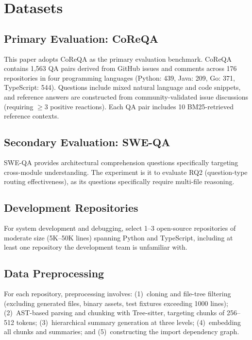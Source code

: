 \documentclass[11pt]{article}
\begin{document}
\section{Datasets}

\subsection{Primary Evaluation: CoReQA}
This paper adopts CoReQA \citep{chen2025coreqa} as the primary evaluation benchmark. CoReQA contains 1,563 QA pairs derived from GitHub issues and comments across 176 repositories in four programming languages (Python: 439, Java: 209, Go: 371, TypeScript: 544). Questions include mixed natural language and code snippets, and reference answers are constructed from community-validated issue discussions (requiring $\geq$3 positive reactions). Each QA pair includes 10 BM25-retrieved reference contexts.

\subsection{Secondary Evaluation: SWE-QA}
SWE-QA \citep{peng2025sweqa} provides architectural comprehension questions specifically targeting cross-module understanding. The experiment is it to evaluate RQ2 (question-type routing effectiveness), as its questions specifically require multi-file reasoning.

\subsection{Development Repositories}
For system development and debugging, select 1--3 open-source repositories of moderate size (5K--50K lines) spanning Python and TypeScript, including at least one repository the development team is unfamiliar with.

\subsection{Data Preprocessing}
For each repository, preprocessing involves: (1)~cloning and file-tree filtering (excluding generated files, binary assets, test fixtures exceeding 1000 lines); (2)~AST-based parsing and chunking with Tree-sitter, targeting chunks of 256--512 tokens; (3)~hierarchical summary generation at three levels; (4)~embedding all chunks and summaries; and (5)~constructing the import dependency graph.
\end{document}
